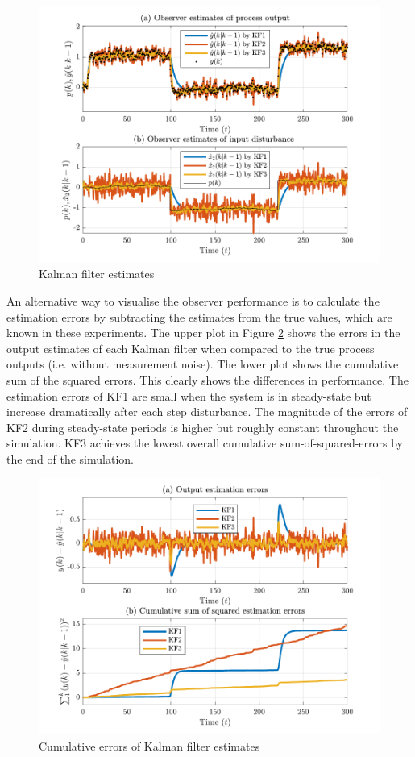 \begin{figure}[htp]
	\centering
	\includegraphics[width=13cm]{images/rod_obs_sim1_y_est1.pdf}
	\caption{Kalman filter estimates}
	\label{fig:sim-sys-siso-KF123-est}
\end{figure}
An alternative way to visualise the observer performance is to calculate the estimation errors by subtracting the estimates from the true values, which are known in these experiments. The upper plot in Figure \ref{fig:sim-sys-siso-KF123-cumerr} shows the errors in the output estimates of each Kalman filter when compared to the true process outputs (i.e. without measurement noise). The lower plot shows the cumulative sum of the squared errors. This clearly shows the differences in performance. The estimation errors of KF1 are small when the system is in steady-state but increase dramatically after each step disturbance. The magnitude of the errors of KF2 during steady-state periods is higher but roughly constant throughout the simulation. KF3 achieves the lowest overall cumulative sum-of-squared-errors by the end of the simulation.
\begin{figure}[htp]
	\centering
	\includegraphics[width=13cm]{images/rod_obs_sim1_cum_err.pdf}
	\caption{Cumulative errors of Kalman filter estimates}
	\label{fig:sim-sys-siso-KF123-cumerr}
\end{figure}

